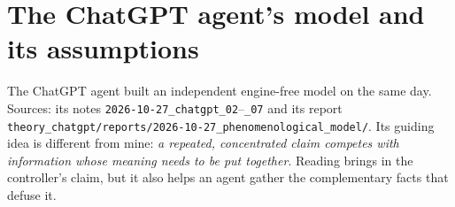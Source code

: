 \documentclass[10pt,a4paper]{article}
\begin{document}
\section{The ChatGPT agent's model and its assumptions}
\label{sec:gpt}
The ChatGPT agent built an independent engine-free model on the same day. Sources: its notes
\nolinkurl{2026-10-27_chatgpt_02}--\nolinkurl{_07} and its report
\nolinkurl{theory_chatgpt/reports/2026-10-27_phenomenological_model/}. Its guiding idea is different from mine:
\emph{a repeated, concentrated claim competes with information whose meaning needs to be put together}. Reading brings
in the controller's claim, but it also helps an agent gather the complementary facts that defuse it.
\end{document}

